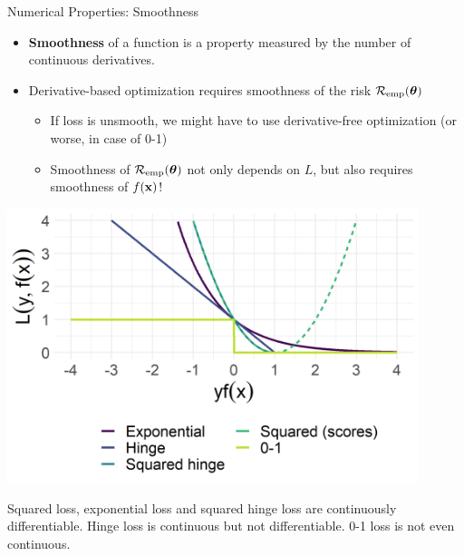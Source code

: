 \documentclass[11pt,compress,t,notes=noshow, xcolor=table]{beamer}
\begin{document}

\begin{vbframe}{Numerical Properties: Smoothness}


\begin{itemize}
  \small
  \item \textbf{Smoothness} of a function is a property measured by 
  the number of continuous derivatives. 
  \item Derivative-based optimization requires smoothness of the 
  risk $\mathcal{R}_{\text{emp}}(\bm{\theta})$ 
  \begin{itemize}
    \small
    \item If loss is unsmooth, we might have to use derivative-free optimization (or worse, in case of 0-1)
    \item Smoothness of $\mathcal{R}_{\text{emp}}(\bm{\theta})$ not only depends on $L$, but also requires smoothness of $f(\mathbf{x})$! 
  \end{itemize}
\end{itemize}

\vfill

\begin{minipage}[c]{0.4\textwidth}
  \includegraphics[width=0.9\textwidth]{figure/plot_loss_overview_classif}
\end{minipage}%
\begin{minipage}[c]{0.05\textwidth}
  \phantom{foo}
\end{minipage}%
\begin{minipage}[c]{0.55\textwidth}
  \footnotesize \raggedright
  Squared loss, exponential loss and squared hinge loss are continuously 
  differentiable. Hinge loss is continuous but not differentiable. 
  0-1 loss is not even continuous.
\end{minipage}%


\end{vbframe}
\end{document}
